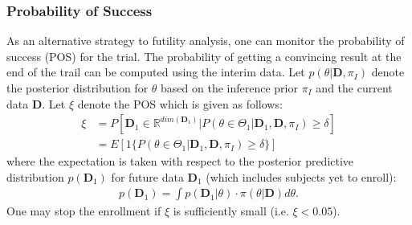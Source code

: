 \documentclass[12pt]{article}
\begin{document}
\subsubsection*{Probability of Success}
As an alternative strategy to futility analysis, one can monitor the probability of success (POS) for the trial. The probability of getting a convincing result at the end of the trail can be computed using the interim data. Let $p(\theta|\mathbf{D}, \pi_{I})$ denote the posterior distribution for $\theta$ based on the inference prior $ \pi_{I}$ and the current data $\mathbf{D}$. Let $\xi$ denote the POS which is given as follows:
\begin{align*}
\xi&=P[\mathbf{D}_1\in\mathbb{R}^{dim(\mathbf{D}_1)}|P(\theta\in\Theta_1|\mathbf{D}_1,\mathbf{D},\pi_I)\geq\delta]\\
&=E[1\{P(\theta\in\Theta_1|\mathbf{D}_1,\mathbf{D}, \pi_{I})\geq \delta\}]
\end{align*}
where the expectation is taken with respect to the posterior predictive distribution $p(\mathbf{D}_1)$ for future data $\mathbf{D}_1$ (which includes subjects yet to enroll):
\begin{align*}
p(\mathbf{D}_1)=\int p(\mathbf{D}_1|\theta)\cdot \pi(\theta|\mathbf{D})d\theta.
\end{align*}
One may stop the enrollment if $\xi$ is sufficiently small (i.e. $\xi<0.05$).
\end{document}

